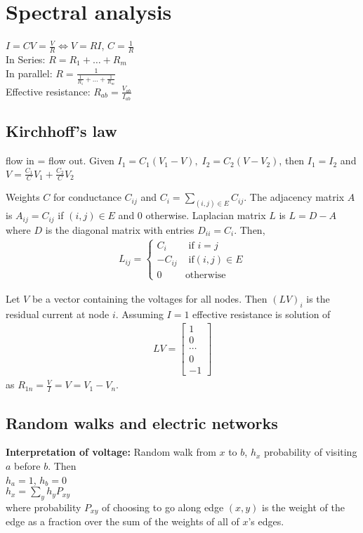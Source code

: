 \section*{Spectral analysis}

$I = CV = \frac{V}{R} \Leftrightarrow V = RI$, $C = \frac{1}{R}$\\
In Series: $R = R_1 + \ldots + R_m$\\
In parallel: $R = \frac{1}{\frac{1}{R_1} + \ldots + \frac{1}{R_m}}$\\
Effective resistance: $R_{ab} = \frac{V_{ab}}{I_{ab}}$

\subsection*{Kirchhoff's law}
flow in = flow out. Given $I_1 = C_1(V_1-V), \; I_2 = C_2(V-V_2)$, then $I_1 = I_2$ and $V = \frac{C_1}{C} V_1 + \frac{C_2}{C} V_2$
    
Weights $C$ for conductance $C_{ij}$ and $C_i = \sum_{(i,j) \in E} C_{ij}$. The adjacency matrix $A$ is $A_{ij} = C_{ij}$ if $(i,j) \in E$ and 0 otherwise. Laplacian matrix $L$ is $L = D - A$ where $D$ is the diagonal matrix with entries $D_{ii} = C_i$. Then,
\begin{align*}
    L_{ij} =
        \begin{cases}
            C_i & \text{ if } i=j\\
            -C_{ij} & \text{ if} (i,j) \in E\\
            0 & \text{otherwise}
        \end{cases}
\end{align*}

Let $V$ be a vector containing the voltages for all nodes. Then $(LV)_i$ is the residual current at node $i$.
Assuming $I=1$ effective resistance is solution of
\begin{align*}
    LV =
        \begin{bmatrix}
            1 \\
            0 \\
            \cdots \\
            0 \\
            -1
        \end{bmatrix}
\end{align*}
as $R_{1n} = \frac{V}{I} = V = V_1 - V_n$.

\subsection*{Random walks and electric networks}
\textbf{Interpretation of voltage:} Random walk from $x$ to $b$, $h_x$ probability of visiting $a$ before $b$. Then\\
$h_a = 1$, $h_b = 0$\\
$h_x = \sum_y h_y P_{xy}$\\
where probability $P_{xy}$ of choosing to go along edge $(x,y)$ is the weight of the edge as a fraction over the sum of the weights of all of $x$'s edges.

